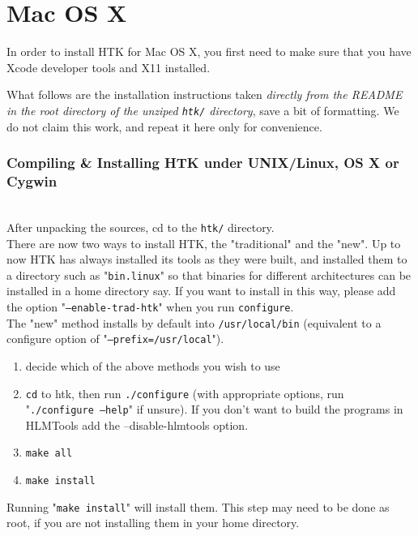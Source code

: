 \documentclass{wileySev}
\begin{document}
\section{Mac OS X}
In order to install HTK for Mac OS X, you first need to make sure that you have Xcode developer tools and X11 installed.

What follows are the installation instructions taken \textit{directly from the README in the root directory of the unziped \texttt{htk/} directory}, save a bit of formatting. We do not claim this work, and repeat it here only for convenience.\\

\subsubsection{Compiling \& Installing HTK under UNIX/Linux, OS X or Cygwin}~\\

After unpacking the sources, cd to the \texttt{htk/} directory.\\

There are now two ways to install HTK, the "traditional" and the
"new".  Up to now HTK has always installed its tools as they were
built, and installed them to a directory such as "\texttt{bin.linux}" so that
binaries for different architectures can be installed in a home
directory say.  If you want to install in this way, please add the
option "\texttt{--enable-trad-htk}" when you run \texttt{configure}.\\

The "new" method installs by default into \texttt{/usr/local/bin} (equivalent
to a configure option of "\texttt{--prefix=/usr/local}").\\

\begin{enumerate}
	\item decide which of the above methods you wish to use
	\item \texttt{cd} to htk, then run \texttt{./configure} (with appropriate options, run "\texttt{./configure --help}" if unsure).
   If you don't want to build the programs in HLMTools add the
   --disable-hlmtools option.
	\item \texttt{make all}
	\item \texttt{make install}
\end{enumerate}

Running "\texttt{make install}" will install them.  This step may need to be
done as root, if you are not installing them in your home directory.\\
\end{document}
